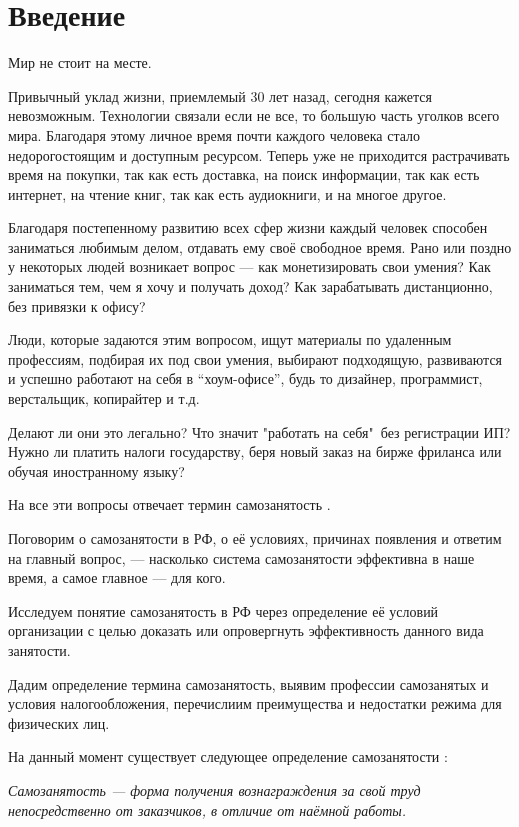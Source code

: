\section*{Введение}

Мир не стоит на месте. 

Привычный уклад жизни, приемлемый 30 лет назад,
сегодня кажется невозможным. 
Технологии связали если не все, то большую часть уголков всего мира.
Благодаря этому личное время почти каждого человека стало 
недорогостоящим и доступным ресурсом. 
Теперь уже не приходится растрачивать время 
на покупки, так как есть доставка,
на поиск информации, так как есть интернет,
на чтение книг, так как есть аудиокниги,
и на многое другое.

Благодаря постепенному развитию всех сфер жизни
каждый человек способен заниматься любимым делом,
отдавать ему своё свободное время. 
Рано или поздно у некоторых людей возникает вопрос ---
как монетизировать свои умения?
Как заниматься тем, чем я хочу и получать доход?
Как зарабатывать дистанционно, без привязки к офису? 

Люди, которые задаются этим вопросом, 
ищут материалы по удаленным профессиям,
подбирая их под свои умения,
выбирают подходящую, 
развиваются и успешно работают на себя в “хоум-офисе”,
будь то дизайнер, программист, верстальщик, копирайтер и т.д. 

Делают ли они это легально? 
Что значит "работать на себя"\ без регистрации ИП? 
Нужно ли платить налоги государству, 
беря новый заказ на бирже фриланса или обучая иностранному языку? 

На все эти вопросы отвечает термин самозанятость \cite{self-employment}.

Поговорим о самозанятости в РФ, 
о её условиях, 
причинах появления и ответим на главный вопрос, --- 
насколько система самозанятости эффективна в наше время, 
а самое главное --- для кого.

Исследуем понятие самозанятость в РФ через определение её условий организации 
с целью доказать или опровергнуть эффективность данного вида занятости. 

Дадим определение термина самозанятость,
выявим профессии самозанятых и условия налогообложения, 
перечислиим преимущества и недостатки режима для физических лиц.

На данный момент существует следующее определение самозанятости
\cite{self-employment-wiki}:

\begin{displayquote}
	\textit{
		Самозанятость --- форма получения вознаграждения за свой труд непосредственно от заказчиков, в отличие от наёмной работы.
	}
\end{displayquote}
